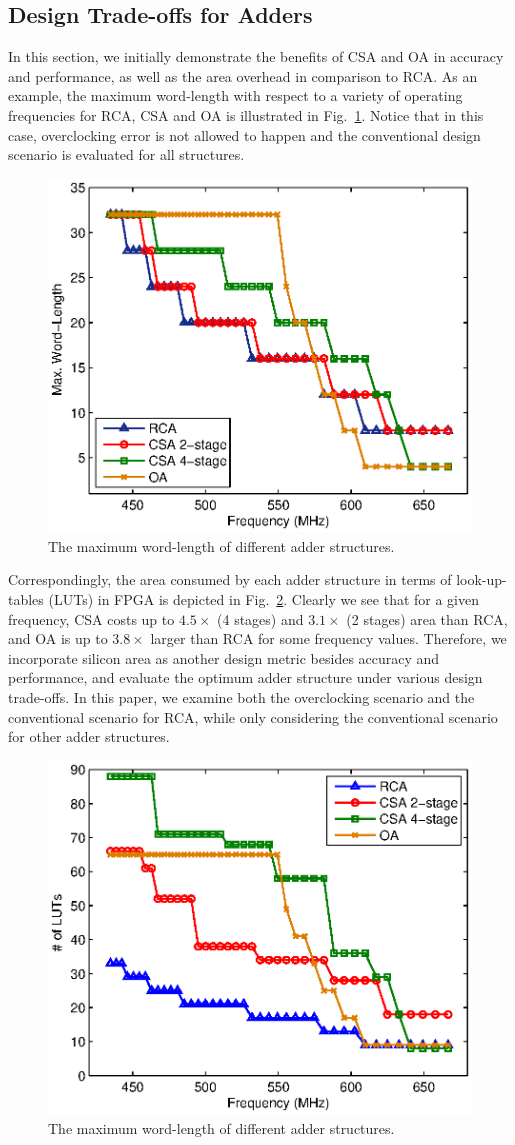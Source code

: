\documentclass[10pt, conference, compsocconf]{IEEEtran}
\begin{document}
\subsection{Design Trade-offs for Adders}
In this section, we initially demonstrate the benefits of CSA and OA in accuracy and performance, as well as the area overhead in comparison to RCA. As an example, the maximum word-length with respect to a variety of operating frequencies for RCA, CSA and OA is illustrated in Fig.~\ref{Fig:max_wl_adder}. Notice that in this case, overclocking error is not allowed to happen and the conventional design scenario is evaluated for all structures.
%
\begin{figure}[tbp]
  \centering
  \includegraphics[width=.5\textwidth]{./figures/exp/max_wl.eps}
  \caption{The maximum word-length of different adder structures.}
  \label{Fig:max_wl_adder}
\end{figure}

Correspondingly, the area consumed by each adder structure in terms of look-up-tables (LUTs) in FPGA is depicted in Fig.~\ref{Fig:area_adder}. Clearly we see that for a given frequency, CSA costs up to $4.5\times$ (4 stages) and $3.1\times$ (2 stages) area than RCA, and OA is up to $3.8\times$ larger than RCA for some frequency values. Therefore, we incorporate silicon area as another design metric besides accuracy and performance, and evaluate the optimum adder structure under various design trade-offs. In this paper, we examine both the overclocking scenario and the conventional scenario for RCA, while only considering the conventional scenario for other adder structures.
\begin{figure}[tbp]
  \centering
  \includegraphics[width=.5\textwidth]{./figures/exp/area_adders.eps}
  \caption{The maximum word-length of different adder structures.}
  \label{Fig:area_adder}
\end{figure}
\end{document}
